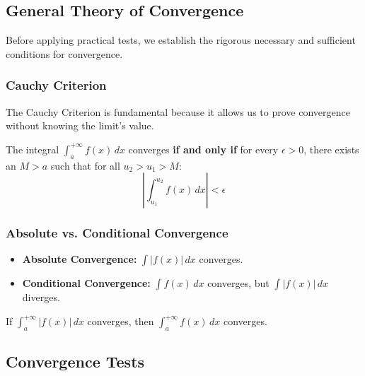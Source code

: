 \subsection{General Theory of Convergence}

Before applying practical tests, we establish the rigorous necessary and sufficient conditions for convergence.

\subsubsection{Cauchy Criterion}
The Cauchy Criterion is fundamental because it allows us to prove convergence without knowing the limit's value.

\begin{theorem}
The integral $\int_a^{+\infty} f(x) \, dx$ converges \textbf{if and only if} for every $\epsilon > 0$, there exists an $M > a$ such that for all $u_2 > u_1 > M$:
\[
\left| \int_{u_1}^{u_2} f(x) \, dx \right| < \epsilon
\]
\end{theorem}

\subsubsection{Absolute vs. Conditional Convergence}
\begin{itemize}
    \item \textbf{Absolute Convergence:} $\int |f(x)| \, dx$ converges.
    \item \textbf{Conditional Convergence:} $\int f(x) \, dx$ converges, but $\int |f(x)| \, dx$ diverges.
\end{itemize}
\begin{theorem}
If $\int_a^{+\infty} |f(x)| \, dx$ converges, then $\int_a^{+\infty} f(x) \, dx$ converges.
\end{theorem}

\subsection{Convergence Tests}

